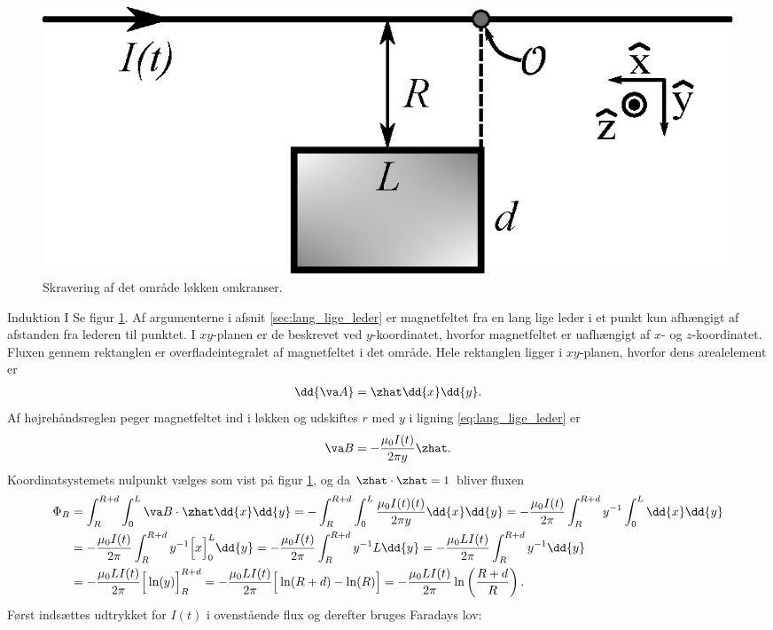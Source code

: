\begin{figure}
    \centering
    \includegraphics[width=.6\columnwidth]{facit/figurer/elektro/induktion_svar.eps}
    \caption{Skravering af det område løkken omkranser.}
    \label{fig:induktion_svar}
\end{figure}
%
\begin{opgave}{Induktion I}
    \opg Se figur \ref{fig:induktion_svar}.
    \opg Af argumenterne i afsnit \ref{sec:lang_lige_leder} er magnetfeltet fra en lang lige leder i et punkt kun afhængigt af afstanden fra lederen til punktet. I $xy$-planen er de beskrevet ved $y$-koordinatet, hvorfor magnetfeltet er uafhængigt af $x$- og $z$-koordinatet.
    \opg Fluxen gennem rektanglen er overfladeintegralet af magnetfeltet i det område. Hele rektanglen ligger i $xy$-planen, hvorfor dens arealelement er
    \begin{align*}
        \dd{\va A} = \zhat\dd{x}\dd{y}.
    \end{align*}
    Af højrehåndsreglen peger magnetfeltet ind i løkken og udskiftes $r$ med $y$ i ligning \eqref{eq:lang_lige_leder} er
    \begin{align*}
        \va B = -\frac{\mu_0I(t)}{2\pi y}\zhat.
    \end{align*}
    Koordinatsystemets nulpunkt vælges som vist på figur \ref{fig:induktion_svar}, og da $\zhat\cdot\zhat = 1$ bliver fluxen
    \begin{align*}
        \Phi_B &= \int_R^{R+d} \int_0^L \va B \cdot \zhat \dd{x}\dd{y} = -\int_R^{R+d} \int_0^L \frac{\mu_0I(t)(t)}{2\pi y} \dd{x}\dd{y} = -\frac{\mu_0I(t)}{2\pi} \int_R^{R+d} y^{-1} \int_0^L \dd{x}\dd{y} \\
        &= -\frac{\mu_0I(t)}{2\pi} \int_R^{R+d} y^{-1} \Big[x\Big]_0^L \dd{y} = -\frac{\mu_0I(t)}{2\pi} \int_R^{R+d} y^{-1} L \dd{y} = -\frac{\mu_0LI(t)}{2\pi} \int_R^{R+d} y^{-1} \dd{y} \\
        &= -\frac{\mu_0LI(t)}{2\pi} \Big[\ln(y)\Big]_R^{R+d} = -\frac{\mu_0LI(t)}{2\pi} \Big[\ln(R+d) - \ln(R)\Big] = -\frac{\mu_0LI(t)}{2\pi}\ln\left(\frac{R+d}{R}\right).
    \end{align*}
    \opg Først indsættes udtrykket for $I(t)$ i ovenstående flux og derefter bruges Faradays lov:

\end{opgave}
